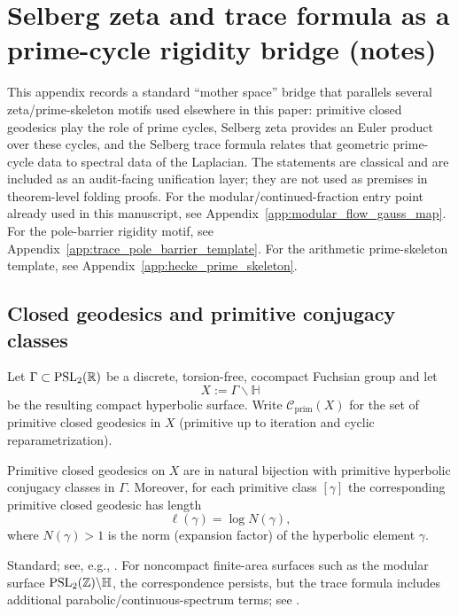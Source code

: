 \section{Selberg zeta and trace formula as a prime-cycle rigidity bridge (notes)}
\label{app:selberg_zeta_trace_bridge}

\AuditTag This appendix records a standard ``mother space'' bridge that parallels several zeta/prime-skeleton motifs used elsewhere in this paper:
primitive closed geodesics play the role of prime cycles, Selberg zeta provides an Euler product over these cycles, and the Selberg trace formula relates that geometric prime-cycle data to spectral data of the Laplacian.
The statements are classical and are included as an audit-facing unification layer; they are not used as premises in theorem-level folding proofs.
For the modular/continued-fraction entry point already used in this manuscript, see Appendix~\ref{app:modular_flow_gauss_map}.
For the pole-barrier rigidity motif, see Appendix~\ref{app:trace_pole_barrier_template}.
For the arithmetic prime-skeleton template, see Appendix~\ref{app:hecke_prime_skeleton}.

\subsection{Closed geodesics and primitive conjugacy classes}
\label{subsec:closed_geodesics_conjugacy}

Let $\Gamma\subset \mathrm{PSL}_2(\mathbb{R})$ be a discrete, torsion-free, cocompact Fuchsian group and let
\[
X:=\Gamma\backslash\mathbb{H}
\]
be the resulting compact hyperbolic surface.
Write $\mathcal{C}_{\mathrm{prim}}(X)$ for the set of primitive closed geodesics in $X$ (primitive up to iteration and cyclic reparametrization).

\begin{theorem}
\label{thm:closed_geodesics_conjugacy_standard}
\MathTag Primitive closed geodesics on $X$ are in natural bijection with primitive hyperbolic conjugacy classes in $\Gamma$.
Moreover, for each primitive class $[\gamma]$ the corresponding primitive closed geodesic has length
\[
\ell(\gamma)=\log N(\gamma),
\]
where $N(\gamma)>1$ is the norm (expansion factor) of the hyperbolic element $\gamma$.
\end{theorem}
\begin{remark}
Standard; see, e.g., \cite{Buser1992,Iwaniec2002}.
For noncompact finite-area surfaces such as the modular surface $\mathrm{PSL}_2(\mathbb{Z})\backslash\mathbb{H}$, the correspondence persists, but the trace formula includes additional parabolic/continuous-spectrum terms; see \cite{Hejhal1983,Iwaniec2002}.
\end{remark}

